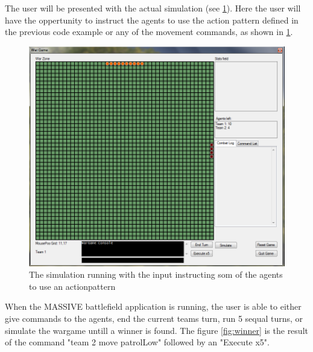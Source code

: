 The user will be presented with the actual simulation (see \ref{fig:runninggame}). Here the user will have the oppertunity to instruct the agents to use the action pattern defined in the previous code example or any of the movement commands, as shown in \ref{fig:runninggame}.

\begin{figure}[h]%
\begin{center}
\includegraphics[scale=0.6]{Images/massive_small.png}%
\end{center}
\caption{The simulation running with the input instructing som of the agents to use an actionpattern}%
\label{fig:runninggame}%
\end{figure}

When the MASSIVE battlefield application is running, the user is able to either give commands to the agents, end the current teams turn, run 5 sequal turns, or simulate the wargame untill a winner is found. The figure \ref{fig:winner} is the result of the command "team 2 move patrolLow" followed by an "Execute x5".

